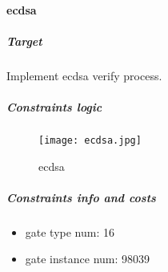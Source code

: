 \paragraph{ecdsa}

\subparagraph{Target}
Implement ecdsa verify process.

\subparagraph{Constraints logic}
\begin{figure}[!ht]
    \centering
    \texttt{[image: ecdsa.jpg]}
    \caption{ecdsa}
    \label{fig:ecdsa}
\end{figure}

\subparagraph{Constraints info and costs}
\begin{itemize}
    \item gate type num: 16
    \item gate instance num: 98039
\end{itemize}
